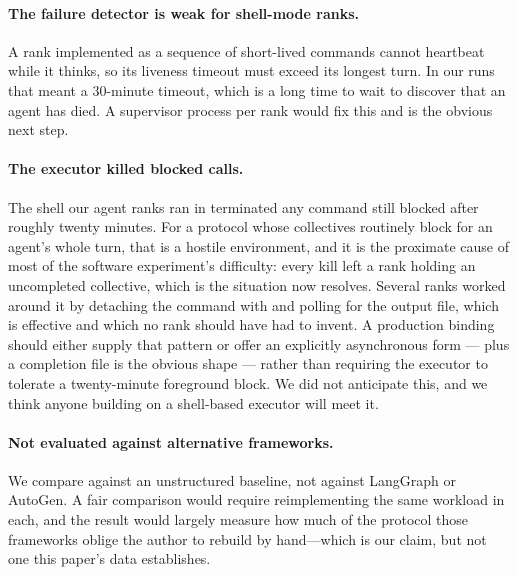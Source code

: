 \paragraph{The failure detector is weak for shell-mode ranks.} A rank
implemented as a sequence of short-lived commands cannot heartbeat while it
thinks, so its liveness timeout must exceed its longest turn. In our runs
that meant a 30-minute timeout, which is a long time to wait to discover
that an agent has died. A supervisor process per rank would fix this and is
the obvious next step.

\paragraph{The executor killed blocked calls.} The shell our agent ranks ran
in terminated any command still blocked after roughly twenty minutes. For a
protocol whose collectives routinely block for an agent's whole turn, that
is a hostile environment, and it is the proximate cause of most of the
software experiment's difficulty: every kill left a rank holding an
uncompleted collective, which is the situation
 now resolves. Several ranks worked around it by
detaching the command with  and polling for the output
file, which is effective and which no rank should have had to invent. A
production binding should either supply that pattern or offer an explicitly
asynchronous form ---  plus a completion file is the obvious
shape --- rather than requiring the executor to tolerate a twenty-minute
foreground block. We did not anticipate this, and we think anyone building
on a shell-based executor will meet it.

\paragraph{Not evaluated against alternative frameworks.} We compare against
an unstructured baseline, not against LangGraph or AutoGen. A fair
comparison would require reimplementing the same workload in each, and the
result would largely measure how much of the protocol those frameworks
oblige the author to rebuild by hand---which is our claim, but not one this
paper's data establishes.
